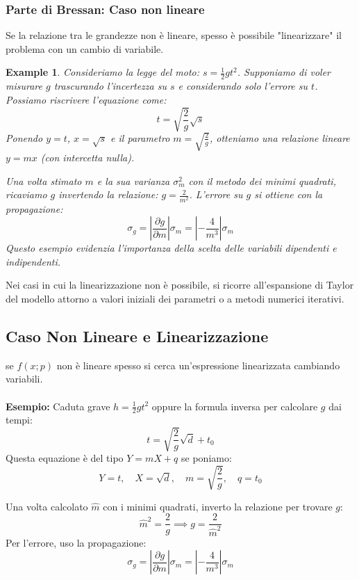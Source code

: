 \documentclass{article}
\newtheorem{example}{Example}
\theoremstyle{remark}
\newcommand{\ripasso}[1]{
    \subsubsection{\texorpdfstring{\color{red}Parte di Bressan: #1}{Parte di Bressan: #1}}
}
\begin{document}
\ripasso{Caso non lineare}
Se la relazione tra le grandezze non è lineare, spesso è possibile "linearizzare" il problema con un cambio di variabile.

\begin{example}
    Consideriamo la legge del moto: $s = \frac{1}{2} g t^2$. 
    Supponiamo di voler misurare $g$ trascurando l'incertezza su $s$ e considerando solo l'errore su $t$.
    Possiamo riscrivere l'equazione come:
    \[ t = \sqrt{\frac{2}{g}} \sqrt{s} \]
    Ponendo $y = t$, $x = \sqrt{s}$ e il parametro $m = \sqrt{\frac{2}{g}}$, otteniamo una relazione lineare $y = mx$ (con intercetta nulla).
    
    Una volta stimato $m$ e la sua varianza $\sigma_m^2$ con il metodo dei minimi quadrati, ricaviamo $g$ invertendo la relazione: $g = \frac{2}{m^2}$.
    L'errore su $g$ si ottiene con la propagazione:
    \[
    \sigma_g = \left| \frac{\partial g}{\partial m} \right| \sigma_m = \left| -\frac{4}{m^3} \right| \sigma_m
    \]
    Questo esempio evidenzia l'importanza della scelta delle variabili dipendenti e indipendenti.
\end{example}

Nei casi in cui la linearizzazione non è possibile, si ricorre all'espansione di Taylor del modello attorno a valori iniziali dei parametri o a metodi numerici iterativi.
\subsection{Caso Non Lineare e Linearizzazione}
se $f(x; p)$ non è lineare spesso si cerca un'espressione linearizzata cambiando variabili.
\\
\\
\textbf{Esempio:} Caduta grave $h = \frac{1}{2}g t^2$ oppure la formula inversa per calcolare $g$ dai tempi:
\[ t = \sqrt{\frac{2}{g}}\sqrt{d} + t_0 \]
Questa equazione è del tipo $Y = mX + q$ se poniamo:
\[ Y = t, \quad X = \sqrt{d}, \quad m = \sqrt{\frac{2}{g}}, \quad q = t_0 \]

Una volta calcolato $\hat{m}$ con i minimi quadrati, inverto la relazione per trovare $g$:
\[ \hat{m}^2 = \frac{2}{g} \implies g = \frac{2}{\hat{m}^2} \]
Per l'errore, uso la propagazione:
\[ \sigma_g = \left| \frac{\partial g}{\partial m} \right| \sigma_m = \left| - \frac{4}{m^3} \right| \sigma_m \]
\end{document}
